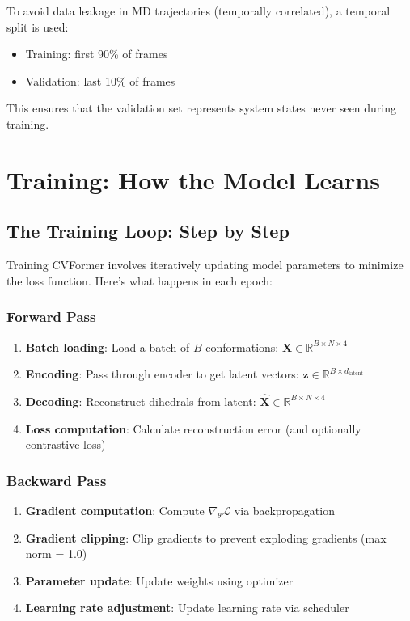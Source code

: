\documentclass[12pt,a4paper]{article}
\begin{document}
To avoid data leakage in MD trajectories (temporally correlated), a temporal split is used:
\begin{itemize}
    \item Training: first 90\% of frames
    \item Validation: last 10\% of frames
\end{itemize}

This ensures that the validation set represents system states never seen during training.

\section{Training: How the Model Learns}

\subsection{The Training Loop: Step by Step}

Training CVFormer involves iteratively updating model parameters to minimize the loss function. Here's what happens in each epoch:

\subsubsection{Forward Pass}
\begin{enumerate}
    \item \textbf{Batch loading}: Load a batch of $B$ conformations: $\mathbf{X} \in \mathbb{R}^{B \times N \times 4}$
    \item \textbf{Encoding}: Pass through encoder to get latent vectors: $\mathbf{z} \in \mathbb{R}^{B \times d_{\text{latent}}}$
    \item \textbf{Decoding}: Reconstruct dihedrals from latent: $\hat{\mathbf{X}} \in \mathbb{R}^{B \times N \times 4}$
    \item \textbf{Loss computation}: Calculate reconstruction error (and optionally contrastive loss)
\end{enumerate}

\subsubsection{Backward Pass}
\begin{enumerate}
    \item \textbf{Gradient computation}: Compute $\nabla_\theta \mathcal{L}$ via backpropagation
    \item \textbf{Gradient clipping}: Clip gradients to prevent exploding gradients (max norm = 1.0)
    \item \textbf{Parameter update}: Update weights using optimizer
    \item \textbf{Learning rate adjustment}: Update learning rate via scheduler
\end{enumerate}
\end{document}
